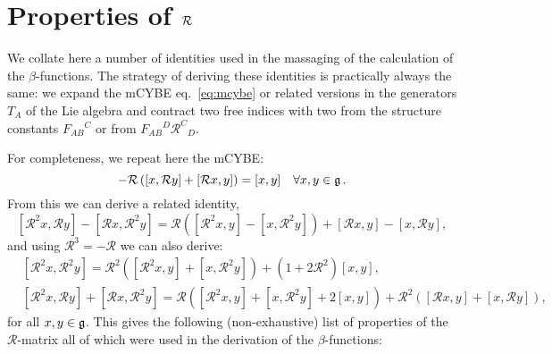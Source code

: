 \documentclass[12pt]{article}
\def\ee{\boldsymbol{e}}
\def\R{{\mathbb R}}
\def\be{\begin{equation}}
\def\ee{\end{equation}}
\renewcommand{\R}{\mathcal{R}}
\begin{document}
\section{Properties of ${\cal R}$ }\label{s:properties}
We collate here a number of identities used in the massaging of the calculation of the $\beta$-functions. The strategy of deriving these identities is practically always the same: we expand the mCYBE eq.~\eqref{eq:mcybe} or related versions in the generators $T_A$ of the Lie algebra and contract two free indices with two from the structure constants $F_{AB}{}^{C}$ or from $F_{AB}{}^D \R^{C}{}_{D}$.

For completeness, we repeat here the mCYBE:
 \be 
[{\cal R} x,  {\cal R} y]  - {\cal R} \left( [x, {\cal R} y ] + [ {\cal R}x, y] \right)  = [x, y] \quad  \forall x, y \in \frak{g}\,  .
 \ee 
 From this we can derive a related identity,
\begin{equation}
\left[ \R^{2}x,\R y\right] - \left[ \R x, \R^{2}y \right] = \R \left( \left[\R^{2}x, y \right] - \left[x,\R^{2}y \right]\right) + \left[\R x,y \right] - \left[ x, \R y\right],
\end{equation}
 and using $\R^{3}=-\R$ we can also derive:
\begin{align}\label{eq:ybr2}
&\left[\R^{2} x, \R^{2}y \right] = \R^{2}\left(\left[\R^{2}x,y \right] +\left[x, \R^{2}y \right]  \right) + (1+2\R^{2})\left[x,y\right],\\
&\left[ \R^{2}x,\R y\right] + \left[ \R x, \R^{2}y \right] =  \R \left(\left[\R^{2}x, y \right] + \left[x,\R^{2}y \right] +2\left[x,y \right]\right)+ \R^{2}\left(\left[\R x,y \right] + \left[ x, \R y\right]\right), 
\end{align}
for all $ x, y \in \frak{g}  $. This gives the following (non-exhaustive) list of properties of the  $\R$-matrix all of which were used in the derivation of the $\beta$-functions:
\begingroup
\allowdisplaybreaks
\end{document}
